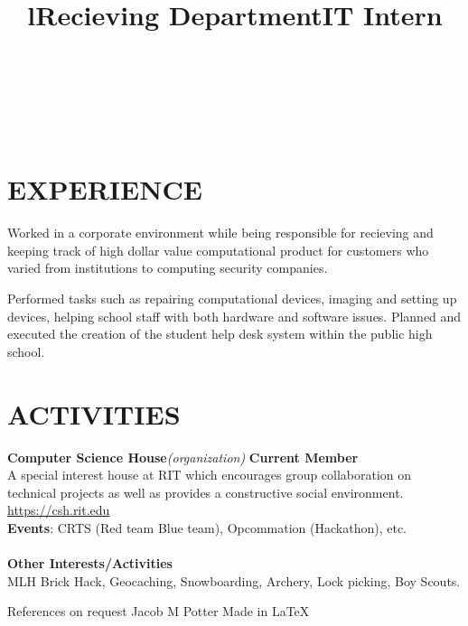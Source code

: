 \documentclass[line,margin]{res}
\begin{document}
\begin{resume}
\begin{format}
\title{l}\\
\\
\body\\
\end{format}
\section{EXPERIENCE}
\title{\textbf{Recieving Department}}
\begin{position}
    Worked in a corporate environment while being responsible for recieving and 
    keeping track of high dollar value computational product for customers who 
    varied from institutions to computing security companies.
\end{position}
\title{\textbf{IT Intern}}
\begin{position}
    Performed tasks such as repairing computational devices, imaging and setting
    up devices, helping school staff with both hardware and software issues. 
    Planned and executed the creation of the student help desk system within the 
    public high school.
\end{position}

\section{ACTIVITIES}
\textbf{Computer Science House}{\sl(organization)}\hfill
    \textbf{Current Member}\\
A special interest house at RIT which encourages group 
collaboration on technical projects as well as provides a constructive social
environment. \href{https://csh.rit.edu}{https://csh.rit.edu}\\\textbf{Events}: 
CRTS (Red team Blue team), Opcommation (Hackathon), etc.\\\\
\textbf{Other Interests/Activities}\\
MLH Brick Hack, Geocaching, Snowboarding, Archery, Lock picking, Boy Scouts.

\end{resume}

\scriptsize{References on request} \hfill 
\scriptsize{Jacob M Potter} \hfill 
\scriptsize{Made in }\tiny{\LaTeX}
\end{document}
